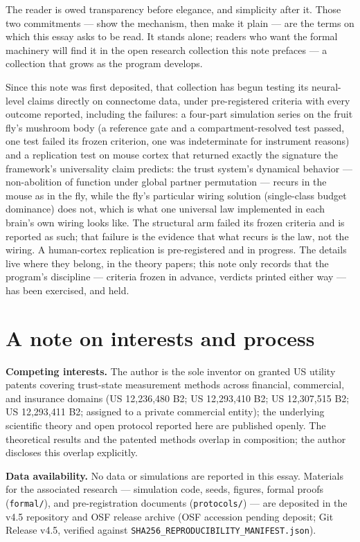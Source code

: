 \documentclass[11pt]{article}
\begin{document}
The reader is owed transparency before elegance, and simplicity after it. Those two commitments --- show the mechanism, then make it plain --- are the terms on which this essay asks to be read. It stands alone; readers who want the formal machinery will find it in the open research collection this note prefaces --- a collection that grows as the program develops.

Since this note was first deposited, that collection has begun testing its neural-level claims directly on connectome data, under pre-registered criteria with every outcome reported, including the failures: a four-part simulation series on the fruit fly's mushroom body (a reference gate and a compartment-resolved test passed, one test failed its frozen criterion, one was indeterminate for instrument reasons) and a replication test on mouse cortex that returned exactly the signature the framework's universality claim predicts: the trust system's dynamical behavior --- non-abolition of function under global partner permutation --- recurs in the mouse as in the fly, while the fly's particular wiring solution (single-class budget dominance) does not, which is what one universal law implemented in each brain's own wiring looks like. The structural arm failed its frozen criteria and is reported as such; that failure is the evidence that what recurs is the law, not the wiring. A human-cortex replication is pre-registered and in progress. The details live where they belong, in the theory papers; this note only records that the program's discipline --- criteria frozen in advance, verdicts printed either way --- has been exercised, and held.

\vspace{1.2em}
\section*{A note on interests and process}

\noindent\textbf{Competing interests.} The author is the sole inventor on granted US utility patents covering trust-state measurement methods across financial, commercial, and insurance domains (US 12,236,480 B2; US 12,293,410 B2; US 12,307,515 B2; US 12,293,411 B2; assigned to a private commercial entity); the underlying scientific theory and open protocol reported here are published openly. The theoretical results and the patented methods overlap in composition; the author discloses this overlap explicitly.

\noindent\textbf{Data availability.} No data or simulations are reported in this essay. Materials for the associated research --- simulation code, seeds, figures, formal proofs (\texttt{formal/}), and pre-registration documents (\texttt{protocols/}) --- are deposited in the v4.5 repository and OSF release archive (OSF accession pending deposit; Git Release v4.5, verified against \texttt{SHA256\_REPRODUCIBILITY\_MANIFEST.json}).
\end{document}
